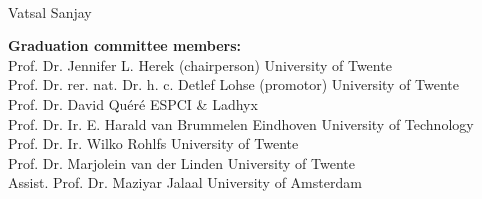 \thispagestyle{empty}
\vspace{6cm}
\begin{center}
{\huge \thesistitle}\\
\vspace{6cm}
{\large Vatsal Sanjay}  %
\end{center}


\newpage
\thispagestyle{empty}
\noindent \textbf{Graduation committee members:} \\
Prof. Dr. Jennifer L. Herek (chairperson) \hfill University of Twente\\
Prof. Dr. rer. nat. Dr. h. c. Detlef Lohse (promotor) \hfill University of Twente\\ 
Prof. Dr. David Qu{\'e}r{\'e} \hfill ESPCI \& Ladhyx\\
Prof. Dr. Ir. E. Harald van Brummelen \hfill Eindhoven University of Technology\\
Prof. Dr. Ir. Wilko Rohlfs \hfill University of Twente\\
Prof. Dr. Marjolein van der Linden  \hfill University of Twente\\
Assist. Prof. Dr. Maziyar Jalaal \hfill University of Amsterdam\\
\vspace{2mm}

